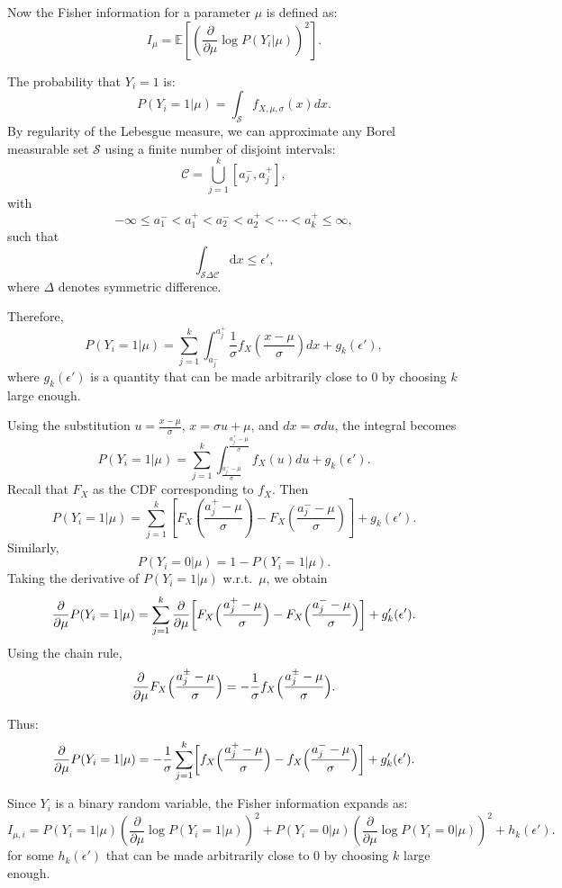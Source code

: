 \documentclass[10pt]{article} %
\theoremstyle{plain}
\theoremstyle{definition}
\theoremstyle{remark}
\newcommand{\bE}{\mathbb E}
\newcommand{\cC}{\mathcal C}
\newcommand{\cS}{\mathcal S}
\newcommand{\dx}{\mathrm{d}}
\begin{document}
\par Now the Fisher information for a parameter \( \mu \) is defined as:
\[
I_\mu = \bE\left[\left(\frac{\partial}{\partial \mu} \log P(Y_i | \mu)\right)^2\right].
\]

The probability that \( Y_i = 1 \) is:
\[
P(Y_i = 1 | \mu) = \int_\cS f_{X, \mu, \sigma}(x) dx.
\]
By  regularity of the Lebesgue measure,  
we can approximate any Borel  measurable set  $\cS$ using a finite number of disjoint intervals:
\[
\cC =\bigcup_{j=1}^k [a_j^-, a_j^+],
\]
with 
\[
-\infty  \leq  a_1^-<a_1^+<   a_2^-<a_2^+  < \cdots  <  a_k^+ \leq \infty,
\]
such that
\[
\int_{ \cS \Delta \cC} \dx x \leq \epsilon', 
\]
where $\Delta$ denotes symmetric difference.

Therefore,
\[
P(Y_i = 1 | \mu) = \sum_{j=1}^k \int_{a_j^-}^{a_j^+} \frac{1}{\sigma} f_X\left(\frac{x - \mu}{\sigma}\right) dx +g_k(\epsilon'),
\]
where $g_k(\epsilon')$ is a quantity that can be made arbitrarily close to $0$ by choosing $k$ large enough. 

Using the substitution \( u = \frac{x - \mu}{\sigma} \), \( x = \sigma u + \mu \), and \( dx = \sigma du \), the integral becomes
\[
P(Y_i = 1 | \mu) = \sum_{j=1}^k \int_{\frac{a_j^- - \mu}{\sigma}}^{\frac{a_j^+ - \mu}{\sigma}} f_X(u) du +g_k(\epsilon').
\]
Recall that \( F_X \) as the CDF corresponding to \( f_X \). Then
\[
P(Y_i = 1 | \mu) = \sum_{j=1}^k \left[F_X\left(\frac{a_j^+ - \mu}{\sigma}\right) - F_X\left(\frac{a_j^- - \mu}{\sigma}\right)\right] +g_k(\epsilon').
\]
Similarly,
\[
P(Y_i = 0 | \mu) = 1 - P(Y_i = 1 | \mu).
\]
Taking the derivative of \( P(Y_i = 1 | \mu) \) w.r.t.\ \( \mu \), we obtain
\[
\frac{\partial}{\partial \mu} P(Y_i = 1 | \mu) 
= \sum_{j=1}^k \frac{\partial}{\partial \mu} \biggl[F_X\Bigl(\frac{a_j^+ - \mu}{\sigma}\Bigr) - F_X\Bigl(\frac{a_j^- - \mu}{\sigma}\Bigr)\biggr] +g_k'(\epsilon').
\]
Using the chain rule,
\[
\frac{\partial}{\partial \mu} F_X\Bigl(\frac{a_j^\pm - \mu}{\sigma}\Bigr) 
= -\frac{1}{\sigma} f_X\Bigl(\frac{a_j^\pm - \mu}{\sigma}\Bigr).
\]

Thus:
\[
\frac{\partial}{\partial \mu} P(Y_i = 1 | \mu) 
= -\frac{1}{\sigma} \sum_{j=1}^k \biggl[f_X\Bigl(\frac{a_j^+ - \mu}{\sigma}\Bigr) - f_X\Bigl(\frac{a_j^- - \mu}{\sigma}\Bigr)\biggr]+g_k'(\epsilon').
\]

Since \( Y_i \) is a binary random variable, the Fisher information expands as:
\[
I_{\mu,i} 
= P(Y_i = 1 | \mu) \left(\frac{\partial}{\partial \mu} \log P(Y_i = 1 | \mu)\right)^2 
+ P(Y_i = 0 | \mu) \left(\frac{\partial}{\partial \mu} \log P(Y_i = 0 | \mu)\right)^2 +h_k(\epsilon').
\]
for some $h_k(\epsilon')$ that can be made arbitrarily close to $0$ by choosing $k$ large enough.
\end{document}
